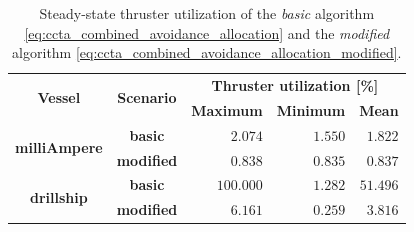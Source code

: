 \begin{table}[t]
    \centering
    \begin{tabular}{cc|rrr}
        \multirow{2}{*}{\textbf{Vessel}} & \multirow{2}{*}{\textbf{Scenario}} & \multicolumn{3}{|c}{\textbf{Thruster utilization [\%]}} \\
        & & \textbf{Maximum} & \textbf{Minimum} & \textbf{Mean} \\ \hline
        \multirow{2}{*}{\textbf{milliAmpere}} & \textbf{basic} & $2.074$ & $1.550$ & $1.822$ \\
        & \textbf{modified} & $0.838$ & $0.835$ & $0.837$ \\
        \multirow{2}{*}{\textbf{drillship}} & \textbf{basic} & $100.000$ & $1.282$ & $51.496$ \\
        & \textbf{modified} & $6.161$ & $0.259$ & $3.816$ 
    \end{tabular}
    \caption{Steady-state thruster utilization of the \emph{basic} algorithm \eqref{eq:ccta_combined_avoidance_allocation} and the \emph{modified} algorithm \eqref{eq:ccta_combined_avoidance_allocation_modified}.}
    \label{tab:thruster_utilization}
    \vspace{-5mm}
\end{table}

